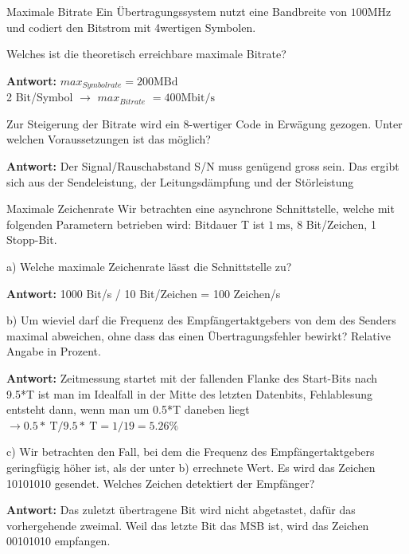 \begin{example2}{Maximale Bitrate}
  Ein Übertragungssystem nutzt eine Bandbreite von $100 \mathrm{MHz}$ und codiert den Bitstrom mit 4wertigen Symbolen.
 
  Welches ist die theoretisch erreichbare maximale Bitrate?
 
 \textbf{Antwort:}
 $max_{Symbolrate} =200 \mathrm{MBd}$\\
 2 Bit/Symbol $\rightarrow$ $max_{Bitrate}$ $=400 \mathrm{Mbit} / \mathrm{s}$
 
 \vspace{2mm}
 
 Zur Steigerung der Bitrate wird ein 8-wertiger Code in Erwägung gezogen. Unter welchen Voraussetzungen ist das möglich?
 
 \textbf{Antwort:}
 Der Signal/Rauschabstand S/N muss genügend gross sein. Das ergibt sich aus der Sendeleistung, der Leitungsdämpfung und der Störleistung
 \end{example2}


 \begin{example2}{Maximale Zeichenrate}
 Wir betrachten eine asynchrone Schnittstelle, welche mit folgenden Parametern betrieben wird: Bitdauer T ist $1 \mathrm{~ms}$, 8 Bit/Zeichen, 1 Stopp-Bit.
 
 a) Welche maximale Zeichenrate lässt die Schnittstelle zu?
 
 \textbf{Antwort:}
 1000 Bit/s / 10 Bit/Zeichen = 100 Zeichen/s
 
 b) Um wieviel darf die Frequenz des Empfängertaktgebers von dem des Senders maximal abweichen, ohne dass das einen Übertragungsfehler bewirkt? Relative Angabe in Prozent.
 
 \textbf{Antwort:}
 Zeitmessung startet mit der fallenden Flanke des Start-Bits nach 9.5*T ist man im Idealfall in der Mitte des letzten Datenbits,
 Fehlablesung entsteht dann, wenn man um 0.5*T daneben liegt $\rightarrow 0.5 * \mathrm{~T} / 9.5 * \mathrm{~T}=1 / 19=5.26 \%$

 c) Wir betrachten den Fall, bei dem die Frequenz des Empfängertaktgebers geringfügig höher ist, als der unter b) errechnete Wert. Es wird das Zeichen 10101010 gesendet. Welches Zeichen detektiert der Empfänger?

 \textbf{Antwort:}
Das zuletzt übertragene Bit wird nicht abgetastet, dafür das vorhergehende zweimal. Weil das letzte Bit das MSB ist, wird das Zeichen 00101010 empfangen.
 \end{example2}



